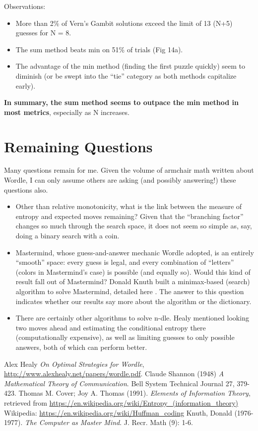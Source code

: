 \documentclass[11pt, oneside]{article} 	%
\begin{document}
Observations:
\begin{itemize}
\item More than 2\% of Vern's Gambit solutions exceed the limit of 13 (N+5) guesses for N = 8.
\item The sum method beats min on 51\% of trials (Fig 14a).  
\item The advantage of the min method (finding the first puzzle quickly) seem to diminish (or be swept into the ``tie'' category as both methods capitalize early).
\end{itemize}


\textbf{In summary, the sum method seems to outpace the min method in most metrics}, especially as N increases.

\section{Remaining Questions}

Many questions remain for me. Given the volume of armchair math written about Wordle, I can only assume others are asking (and possibly answering!) these questions also.

\begin{itemize}
\item Other than relative monotonicity, what is the link between the measure of entropy and expected moves remaining? Given that the ``branching factor'' changes so much through the search space, it does not seem so simple as, say, doing a binary search with a coin.
\item Mastermind, whose guess-and-answer mechanic Wordle adopted, is an entirely ``smooth'' space: every guess is legal, and every combination of ``letters'' (colors in Mastermind's case) is possible (and equally so). Would this kind of result fall out of Mastermind? Donald Knuth built a minimax-based (search) algorithm to solve Mastermind, detailed here \cite{5}. The answer to this question indicates whether our results say more about the algorithm or the dictionary.
\item There are certainly other algorithms to solve n-dle. Healy \cite{1} mentioned looking two moves ahead and estimating the conditional entropy there (computationally expensive), as well as limiting guesses to only possible answers, both of which can perform better.
\end{itemize}

\begin{thebibliography}{9}

Alex Healy \emph{On Optimal Strategies for Wordle}, \url{http://www.alexhealy.net/papers/wordle.pdf}.
Claude Shannon (1948) \emph{A Mathematical Theory of Communication}. Bell System Technical Journal 27, 379-423.
Thomas M. Cover; Joy A. Thomas (1991). \emph{Elements of Information Theory}, retrieved from \url{https://en.wikipedia.org/wiki/Entropy_(information_theory)}
Wikipedia: \url{https://en.wikipedia.org/wiki/Huffman_coding}
Knuth, Donald (1976-1977). \emph{The Computer as Master Mind}. J. Recr. Math (9): 1-6.
\end{thebibliography}
\end{document}
